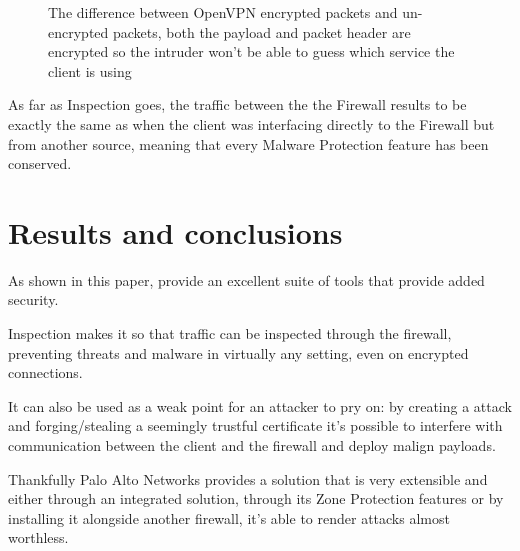 \begin{figure}[!hb]
 \centering
 \vspace{0.5cm}
 \caption{The difference between OpenVPN encrypted packets and un-encrypted packets, both the payload and packet header are encrypted so the intruder won't be able to guess which service the client is using}
\end{figure}

As far as  Inspection goes, the traffic between the  the Firewall results to be exactly the same as when the client was interfacing directly to the Firewall but from another source, meaning that every Malware Protection feature has been conserved.

\chapter{Results and conclusions}

As shown in this paper,  provide an excellent suite of tools that provide added security.

 Inspection makes it so that traffic can be inspected through the firewall, preventing threats and malware in virtually any setting, even on encrypted connections.

It can also be used as a weak point for an attacker to pry on: by creating a  attack and forging/stealing a seemingly trustful certificate it's possible to interfere with communication between the client and the firewall and deploy malign payloads.

Thankfully Palo Alto Networks provides a  solution that is very extensible and either through an integrated  solution, through its Zone Protection features  or by installing it alongside another firewall, it's able to render  attacks almost worthless.

